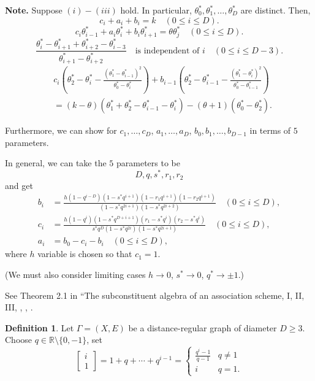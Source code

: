 \documentclass[
]{book}
\theoremstyle{definition}
\newtheorem{definition}{Definition}[chapter]
\theoremstyle{definition}
\theoremstyle{definition}
\theoremstyle{definition}
\theoremstyle{remark}
\begin{document}
\textbf{Note.} Suppose \((i)-(iii)\) hold. In particular, \(\theta^*_0, \theta^*_1, \ldots, \theta^*_D\) are distinct. Then,
\[c_i + a_i + b_i = k\quad (0\leq i\leq D).\]
\[c_i\theta^*_{i-1} + a_i\theta^*_i + b_i\theta^*_{i+1} = \theta \theta^*_j \quad (0\leq i\leq D).\]
\[\frac{\theta^*_i-\theta^*_{i+1}+\theta^*_{i+2}-\theta^*_{i-3}}{\theta^*_{i+1}-\theta^*_{i+2}}\quad \text{is independent of $i$}\quad (0\leq i\leq D-3).\]
\begin{align}
& c_i\left(\theta^*_2 - \theta^*_i - \frac{(\theta^*_1-\theta^*_{i-1})^2}{\theta^*_0-\theta^*_i}\right) + b_{i-1}\left(\theta^*_2 - \theta^*_{i-1} - \frac{(\theta^*_1-\theta^*_{i})^2}{\theta^*_0-\theta^*_{i-1}}\right)\\
& = (k-\theta)(\theta^*_1+\theta^*_2-\theta^*_{i-1}-\theta^*_i)-(\theta+1)(\theta^*_0-\theta^*_2).
\end{align}

Furthermore, we can show for \(c_1, \ldots, c_D\), \(a_1, \ldots, a_D\), \(b_0, b_1, \ldots, b_{D-1}\) in terms of \(5\) parameters.

In general, we can take the \(5\) parameters to be
\[D, q, s^*, r_1, r_2\]
and get
\begin{align}
b_i & = \frac{h(1-q^{i-D})(1-s^*q^{i+1})(1-r_1q^{i+1})(1-r_2q^{i+1})}{(1-s^*q^{2i+1})(1-s^*q^{2i+2})} \quad (0\leq i\leq D),\\
c_i & = \frac{h(1-q^{i})(1-s^*q^{D+i+1})(r_1-s^*q^{i})(r_2-s^*q^{i})}{s^*q^D(1-s^*q^{2i})(1-s^*q^{2i+1})} \quad (0\leq i\leq D),\\
a_i & = b_0 - c_i - b_i \quad (0\leq i\leq D),
\end{align}
where \(h\) variable is chosen so that \(c_1 = 1\).

(We must also consider limiting cases \(h\to 0\), \(s^*\to 0\), \(q^*\to \pm 1\).)

See Theorem 2.1 in ``The subconstituent algebra of an association scheme, I, II, III, \citep{terwilliger:1992}, \citep{terwilliger:1993-1}, \citep{terwilliger:1993-2}.

\begin{definition}
\protect\hypertarget{def:qbinomial}{}\label{def:qbinomial}Let \(\Gamma = (X,E)\) be a distance-regular graph of diameter \(D\geq 3\). Choose \(q \in \mathbb{R}\setminus \{0,-1\}\), set
\[\begin{bmatrix}{i}\\{1}\end{bmatrix} = 1 + q + \cdots + q^{i-1} = \begin{cases} \frac{q^i-1}{q-1} & q\neq 1\\
i & q = 1.\end{cases}\]
\end{definition}
\end{document}

